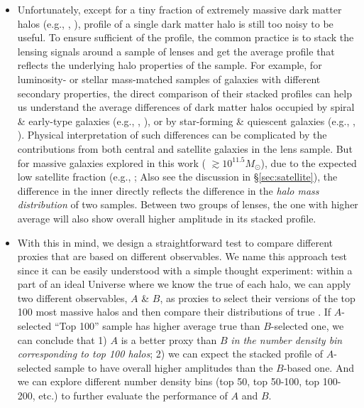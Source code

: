 \documentclass[fleqn,usenatbib,useAMS,english]{mnras}
\begin{document}
\begin{itemize}
        \item Unfortunately, except for a tiny fraction of extremely massive dark matter 
            halos (e.g., \citealt{Sereno2018}, \addref{}), \dsigma{} profile of a single dark
            matter halo is still too noisy to be useful.
            To ensure sufficient \snratio{} of the \dsigma{} profile, the common practice is 
            to stack the lensing signals around a sample of lenses and get the average \dsigma{}
            profile that reflects the underlying halo properties of the sample.
            For example, for luminosity- or stellar mass-matched samples of galaxies with 
            different secondary properties, the direct comparison of their stacked \dsigma{}
            profiles can help us understand the average differences of dark matter halos occupied 
            by spiral \& early-type galaxies (e.g., \citealt{Mandelbaum2006a}, \addref{}), 
            or by star-forming \& quiescent galaxies (e.g., \citealt{Mandelbaum2016}, \addref{}).
            Physical interpretation of such differences can be complicated by the
            contributions from both central and satellite galaxies in the lens sample.
            But for massive galaxies explored in this work (\mstar{} $\gtrsim 10^{11.5} M_{\odot}$),
            due to the expected low satellite fraction 
            (e.g., \citealt{Mandelbaum2006a, vanUitert2016}; \addref{} Also see the discussion 
            in \S \ref{sec:satellite}), the difference in the inner \dsigma{} directly 
            reflects the difference in the \emph{halo mass distribution} of two samples.
            Between two groups of lenses, the one with higher average \mvir{} will also show 
            overall higher amplitude in its stacked \dsigma{} profile.
        
        \item With this in mind, we design a straightforward test to compare different \mvir{}
            proxies that are based on different observables.
            We name this approach \topn{} test since it can be easily understood with a simple
            thought experiment: within a part of an ideal Universe where we know the true \mvir{}
            of each halo, we can apply two different observables, $A$ \& $B$, as \mvir{} proxies 
            to select their versions of the top 100 most massive halos and then compare their 
            distributions of true \mvir{}.
            If $A$-selected ``Top 100'' sample has higher average true \mvir{} than $B$-selected one,
            we can conclude that 1) $A$ is a better \mvir{} proxy than $B$ \emph{in the number
            density bin corresponding to top 100 halos}; 2) we can expect the stacked \dsigma{} 
            profile of $A$-selected sample to have overall higher amplitudes than the $B$-based one.
            And we can explore different number density bins 
            (top 50, top 50-100, top 100-200, etc.) to further evaluate the performance of $A$ and $B$.
        

\end{itemize}
\end{document}
